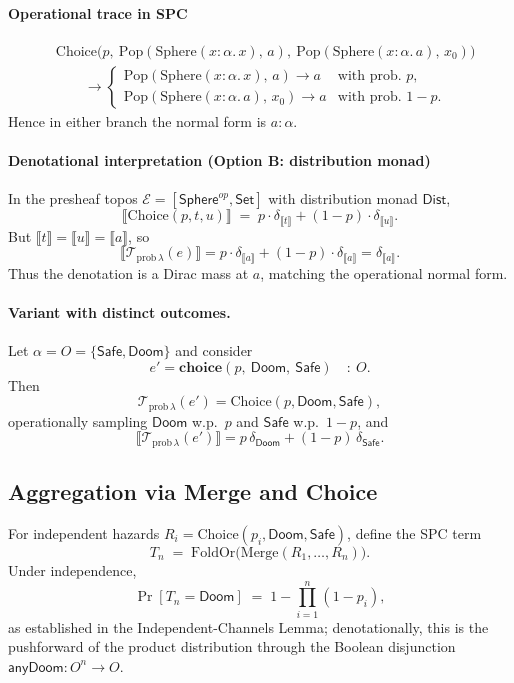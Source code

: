 \documentclass{article}
\begin{document}
\paragraph{Operational trace in SPC}
\[
\begin{aligned}
&\mathrm{Choice}\!\big(p,\ \mathrm{Pop}(\mathrm{Sphere}(x{:}\alpha.\,x),\,a),\ \mathrm{Pop}(\mathrm{Sphere}(x{:}\alpha.\,a),\,x_0)\big) \\
&\qquad\to
\begin{cases}
\mathrm{Pop}(\mathrm{Sphere}(x{:}\alpha.\,x),\,a) \to a & \text{with prob.\ } p,\\
\mathrm{Pop}(\mathrm{Sphere}(x{:}\alpha.\,a),\,x_0) \to a & \text{with prob.\ } 1-p.
\end{cases}
\end{aligned}
\]
Hence in either branch the normal form is $a:\alpha$.

\paragraph{Denotational interpretation (Option B: distribution monad)}
In the presheaf topos $\mathcal{E}=[\mathsf{Sphere}^{op},\mathsf{Set}]$ with distribution monad $\mathsf{Dist}$,
\[
\llbracket \mathrm{Choice}(p,t,u)\rrbracket
\;=\; p\cdot\delta_{\llbracket t\rrbracket} + (1-p)\cdot\delta_{\llbracket u\rrbracket}.
\]
But $\llbracket t \rrbracket=\llbracket u \rrbracket=\llbracket a \rrbracket$, so
\[
\llbracket \mathcal{T}_{\mathrm{prob}\,\lambda}(e) \rrbracket
= p\cdot\delta_{\llbracket a \rrbracket} + (1-p)\cdot\delta_{\llbracket a \rrbracket}
= \delta_{\llbracket a \rrbracket}.
\]
Thus the denotation is a Dirac mass at $a$, matching the operational normal form.

\paragraph{Variant with distinct outcomes.}
Let $\alpha=O=\{\mathsf{Safe},\mathsf{Doom}\}$ and consider
\[
e'=\mathbf{choice}(p,\ \mathsf{Doom},\ \mathsf{Safe}) \quad:\ O.
\]
Then
\[
\mathcal{T}_{\mathrm{prob}\,\lambda}(e')=\mathrm{Choice}(p,\mathsf{Doom},\mathsf{Safe}),
\]
operationally sampling $\mathsf{Doom}$ w.p.\ $p$ and $\mathsf{Safe}$ w.p.\ $1-p$, and
\[
\llbracket \mathcal{T}_{\mathrm{prob}\,\lambda}(e') \rrbracket
= p\,\delta_{\mathsf{Doom}} + (1-p)\,\delta_{\mathsf{Safe}}.
\]

\subsection{Aggregation via Merge and Choice}

For independent hazards $R_i=\mathrm{Choice}(p_i,\mathsf{Doom},\mathsf{Safe})$,
define the SPC term
\[
T_n \;=\; \mathrm{FoldOr}\big(\mathrm{Merge}(R_1,\dots,R_n)\big).
\]
Under independence,
\[
\Pr[T_n=\mathsf{Doom}] \;=\; 1 - \prod_{i=1}^n (1-p_i),
\]
as established in the Independent-Channels Lemma; denotationally, this is the pushforward of the product distribution through the Boolean
disjunction $\mathsf{anyDoom}:O^n\to O$.



\end{document}
